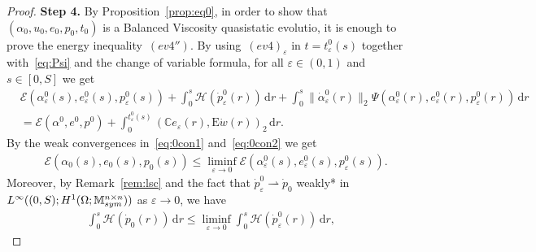\documentclass[reqno]{amsart}
\theoremstyle{definition}
\numberwithin{equation}{section}
\def\de {\mathrm{d}}
\def\M {\mathbb M^{n\times n}_{\rm sym}}
\def\C {\mathbb C}
\def\EE {\mathrm{E}}
\begin{document}
\begin{proof}
{\bf Step 4.} By Proposition~\ref{prop:eq0}, in order to show that $(\alpha_0,u_0,e_0,p_0,t_0)$ is a Balanced Viscosity quasistatic evolutio, it is enough to prove the energy inequality~$(ev4'')$. By using~$(ev4)_\varepsilon$ in $t=t_\varepsilon^0(s)$ together with~\eqref{eq:Psi} and the change of variable formula, for all $\varepsilon\in(0,1)$ and $s\in[0,S]$ we get
\begin{align}
&\mathcal E(\alpha_\varepsilon^0(s),e_\varepsilon^0(s),p_\varepsilon^0(s))+\int_0^s\mathcal H(\dot p_\varepsilon^0(r))\,\de r+\int_0^s\|\dot\alpha_\varepsilon^0(r)\|_2\Psi(\alpha_\varepsilon^0(r),e_\varepsilon^0(r),p_\varepsilon^0(r))\,\de r\nonumber\\
 &=\mathcal E(\alpha^0,e^0,p^0)+\int_0^{t_\varepsilon^0(s)}(\C e_\varepsilon(r),\EE \dot w(r))_2\,\de r.\label{eq:eneqe}
 \end{align}
 By the weak convergences in~\eqref{eq:0con1} and~\eqref{eq:0con2} we get
 \begin{align*}
&\mathcal E(\alpha_0(s),e_0(s),p_0(s))\le\liminf_{\varepsilon\to 0}\mathcal E(\alpha_\varepsilon^0(s),e_\varepsilon^0(s),p_\varepsilon^0(s)).
 \end{align*}
Moreover, by Remark~\ref{rem:lsc} and the fact that $\dot p_\varepsilon^0\rightharpoonup \dot p_0$ weakly* in $L^\infty((0,S);H^1(\Omega;\M))$ as $\varepsilon\to 0$, we have
\begin{align*}
\int_0^s\mathcal H(\dot p_0(r))\,\de r\le\liminf_{\varepsilon\to 0}\int_0^s\mathcal H(\dot p_\varepsilon^0(r))\,\de r,
 \end{align*}



\end{proof}
\end{document}
